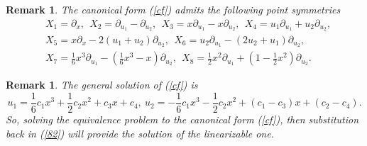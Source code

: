 \documentclass[12pt]{article}
\newtheorem{remark}[theorem]{Remark}
\begin{document}
\begin{remark}
The canonical form (\ref{cf}) admits the following point symmetries
\begin{equation}
\begin{aligned}
&X_1=\partial_x, ~~X_2=\partial_{u_1}-\partial_{u_2}, ~~X_3=x\partial_{u_1}-x\partial_{u_2},~~X_4=u_1\partial_{u_1}+u_2\partial_{u_2},\\
& X_5=x\partial_{x}-2(u_1+u_2)\partial_{u_2},~~ X_6=u_2\partial_{u_1}-(2u_2+u_1)\partial_{u_2},~~\\
& X_7=\frac{1}{6}x^3\partial_{u_1}-(\frac{1}{6}x^3-x)\partial_{u_2},~~X_8=\frac{1}{2}x^2\partial_{u_1}+(1-\frac{1}{2}x^2)\partial_{u_2}.
\end{aligned}
\end{equation}
\end{remark}

\begin{remark}
The general solution of (\ref{cf}) is 
\begin{equation}\label{82}
u_1=\frac{1}{6}c_1x^3+\frac{1}{2}c_2x^2+c_3x+c_4,~u_2=-\frac{1}{6}c_1x^3-\frac{1}{2}c_2x^2+(c_1-c_3)x+(c_2-c_4).
\end{equation}
 So, solving the equivalence problem to the canonical form (\ref{cf}), then substitution back in (\ref{82}) will provide the solution of the linearizable one.\\
\end{remark}
\end{document}
